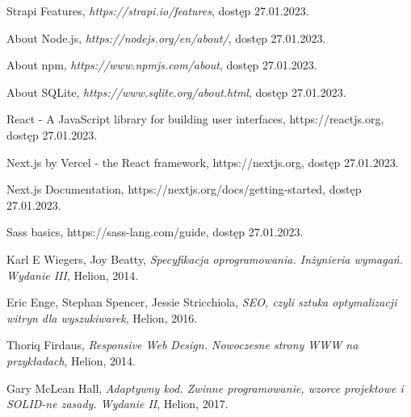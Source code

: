 \documentclass[a4paper, 12pt]{article}
\numberwithin{figure}{section}
\begin{document}
\begin{sloppypar}
\begin{thebibliography}{99}
    Strapi Features,
    \textit{https://strapi.io/features},
    dostęp 27.01.2023.

    About Node.js,
    \textit{https://nodejs.org/en/about/},
    dostęp 27.01.2023.

    About npm,
    \textit{https://www.npmjs.com/about},
    dostęp 27.01.2023.

    About SQLite,
    \textit{https://www.sqlite.org/about.html},
    dostęp 27.01.2023.

    React - A JavaScript library for building user interfaces,
    {https://reactjs.org},
    dostęp 27.01.2023.

    Next.js by Vercel - the React framework,
    {https://nextjs.org},
    dostęp 27.01.2023. 

    Next.js Documentation,
    {https://nextjs.org/docs/getting-started},
    dostęp 27.01.2023.

    Sass basics,
    {https://sass-lang.com/guide},
    dostęp 27.01.2023.

    Karl E Wiegers, Joy Beatty,
    \textit{Specyfikacja oprogramowania. Inżynieria wymagań. Wydanie III},
    Helion,
    2014.
    
    Eric Enge, Stephan Spencer, Jessie Stricchiola,
    \textit{SEO, czyli sztuka optymalizacji witryn dla wyszukiwarek},
    Helion,
    2016.

    Thoriq Firdaus,
    \textit{Responsive Web Design. Nowoczesne strony WWW na przykładach},
    Helion, 
    2014.

    Gary McLean Hall,
    \textit{Adaptywny kod. Zwinne programowanie, wzorce projektowe i SOLID-ne zasady. Wydanie II},
    Helion,
    2017.

        
\end{thebibliography}

\end{sloppypar}
\end{document}
